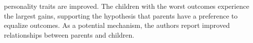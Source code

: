 personality traits are improved. The children with the worst outcomes experience the largest gains, supporting the hypothesis that parents have a preference to equalize outcomes. As a potential mechanism, the authors report improved relationships between parents and children.







	









